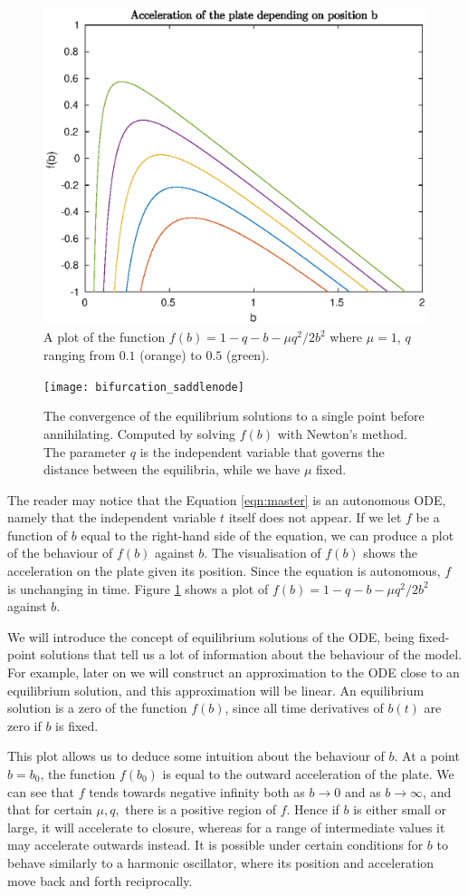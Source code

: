 \documentclass{report}
\begin{document}
\begin{figure}[h!]
    \centering
    \includegraphics[width=0.5\linewidth]{f_plot_mu_1_q_vary}
    \caption{A plot of the function $f(b) = 1-q-b-\mu q^2/2b^2$ where $\mu=1$, $q$ ranging from $0.1$ (orange) to $0.5$ (green).}
    \label{fig:acc_b_plot}
\end{figure}

\begin{figure}
	\centering
	\texttt{[image: bifurcation\_saddlenode]}
	\caption{
		The convergence of the equilibrium solutions to a single point before annihilating. Computed by solving \(f(b)\) with Newton's method.
		The parameter \(q\) is the independent variable that governs the distance between the equilibria, while we have \(\mu\) fixed.
	}
	\label{fig:bifurcation}
\end{figure}
The reader may notice that the Equation \ref{eqn:master} is an autonomous ODE,
namely that the independent variable $t$ itself does not appear.
If we let $f$ be a function of $b$ equal to the right-hand side of the equation,
we can produce a plot of the behaviour of $f(b)$ against $b$.
The visualisation of $f(b)$ shows the acceleration on the plate given its position.
Since the equation is autonomous, $f$ is unchanging in time.
Figure \ref{fig:acc_b_plot} shows a plot of $f(b)= 1 - q - b - \mu q^2/2b^2$ against $b$.

We will introduce the concept of equilibrium solutions of the ODE,
being fixed-point solutions that tell us a lot of information about the behaviour of the model.
For example, later on we will construct an approximation to the ODE close to an equilibrium solution,
and this approximation will be linear.
An equilibrium solution is a zero of the function \(f(b)\), since all time derivatives of \(b(t)\) are zero if \(b\) is fixed.

This plot allows us to deduce some intuition about the behaviour of $b$.
At a point $b=b_0$, the function $f(b_0)$ is equal to the outward acceleration of the plate.
We can see that $f$ tends towards negative infinity both as $b\rightarrow 0$ and as $b\rightarrow\infty$,
and that for certain $\mu, q,$ there is a positive region of $f$.
Hence if $b$ is either small or large, it will accelerate to closure,
whereas for a range of intermediate values it may accelerate outwards instead.
It is possible under certain conditions for $b$ to behave similarly to a harmonic oscillator,
where its position and acceleration move back and forth reciprocally.
\end{document}
